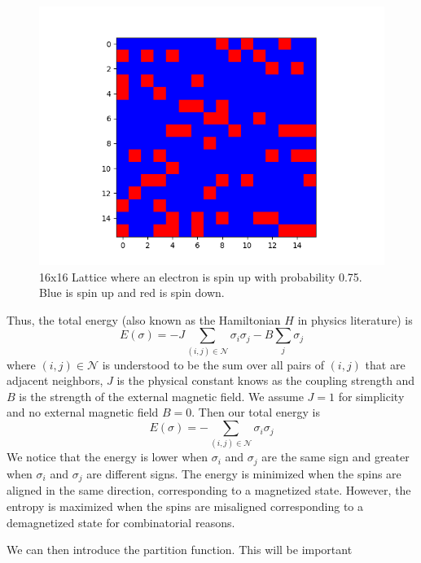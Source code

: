 \documentclass{article}
\begin{document}
    \begin{figure}[ht]
        \includegraphics[width=\columnwidth]{diagrams/16x16_lattice.png}
        \caption{16x16 Lattice where an electron is spin up with probability 0.75. Blue is spin up and red is spin down.}
        \label{fig:4}
    \end{figure}
    
    Thus, the total energy (also known as the Hamiltonian $H$ in physics literature) is
\begin{equation}
    E(\sigma) = - J \sum_{(i,j) \in \mathcal{N}} \sigma_i \sigma_j - B \sum_{j} \sigma_j
\end{equation}
where $(i,j) \in \mathcal{N}$ is understood to be the sum over all pairs of $(i,j)$ that are adjacent neighbors,
$J$ is the physical constant knows as the coupling strength and $B$ is the strength of the external magnetic field.
We assume $J=1$ for simplicity and no external magnetic field $B=0$. Then our total energy is
\begin{equation}
    E(\sigma) = - \sum_{(i,j) \in \mathcal{N}} \sigma_i \sigma_j 
\end{equation} 
We notice that the energy is lower when $\sigma_i$ and $\sigma_j$ are the same sign and greater when $\sigma_i$ and $\sigma_j$ 
are different signs. The energy is minimized when the spins are aligned in the same direction, corresponding to a magnetized state.
However, the entropy is maximized when the spins are misaligned corresponding to a demagnetized state for combinatorial reasons.

We can then introduce the partition function. This will be important 
\end{document}

